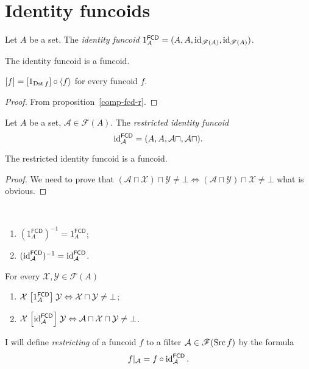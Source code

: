 \section{Identity funcoids}

\begin{defn}
Let $A$ be a set. The \emph{identity funcoid}
$1_{A}^{\mathsf{FCD}}=(A,A,\operatorname{id}_{\mathscr{F}(A)},\operatorname{id}_{\mathscr{F}(A)})$.
\end{defn}
\begin{obvious}
The identity funcoid is a funcoid.\end{obvious}
\begin{prop}
$\mathord{\mathrel{\left[f\right]}}=\mathord{\mathrel{\left[1_{\operatorname{Dst} f}\right]}}\circ\left\langle f\right\rangle$
for every funcoid $f$.\end{prop}
\begin{proof}
From proposition~\ref{comp-fcd-r}.\end{proof}
\begin{defn}
Let $A$ be a set,
$\mathcal{A}\in\mathscr{F}(A)$.
The \emph{restricted identity funcoid
\[
\operatorname{id}_{\mathcal{A}}^{\mathsf{FCD}}=(A,A,\mathcal{A}\sqcap,\mathcal{A}\sqcap).
\]
}\end{defn}
\begin{prop}
The restricted identity funcoid is a funcoid.\end{prop}
\begin{proof}
We need to prove that
$(\mathcal{A}\sqcap\mathcal{X})\sqcap\mathcal{Y}\ne\bot
\Leftrightarrow(\mathcal{A}\sqcap\mathcal{Y})\sqcap\mathcal{X}\ne\bot$
what is obvious.\end{proof}

\begin{obvious}
~
\begin{enumerate}
\item $(1_{A}^{\mathsf{FCD}})^{-1}=1_{A}^{\mathsf{FCD}}$;
\item
$(\operatorname{id}_{\mathcal{A}}^{\mathsf{FCD}})^{-1}=\operatorname{id}_{\mathcal{A}}^{\mathsf{FCD}}$.
\end{enumerate}
\end{obvious}

\begin{obvious}
For every $\mathcal{X},\mathcal{Y}\in\mathscr{F}(A)$
\begin{enumerate}
\item
$\mathcal{X}\mathrel{\left[1_{A}^{\mathsf{FCD}}\right]}\mathcal{Y}\Leftrightarrow\mathcal{X}
\sqcap\mathcal{Y}\ne\bot$;
\item
$\mathcal{X}\mathrel{\left[\operatorname{id}_{\mathcal{A}}^{\mathsf{FCD}}\right]}\mathcal{Y}
\Leftrightarrow\mathcal{A}\sqcap\mathcal{X}\sqcap\mathcal{Y}\ne\bot$.
\end{enumerate}
\end{obvious}
\begin{defn}
I will define \emph{restricting} of a
funcoid $f$ to a filter $\mathcal{A}\in\mathscr{F}(\operatorname{Src} f)$ by the
formula
\[
f|_{\mathcal{A}}=f\circ\operatorname{id}_{\mathcal{A}}^{\mathsf{FCD}}.
\]
\end{defn}

